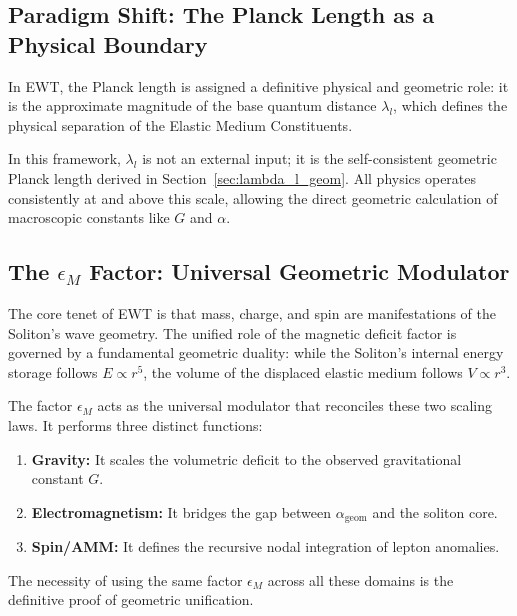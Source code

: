 \documentclass[10pt,a4paper]{article}
\begin{document}
\subsection{Paradigm Shift: The Planck Length as a Physical Boundary}
\label{sec:planck_paradigm}

In EWT, the Planck length is assigned a definitive physical and geometric role: it is the approximate magnitude of the base quantum distance \(\lambda_l\), which defines the physical separation of the Elastic Medium Constituents.

In this framework, \(\lambda_l\) is not an external input; it is the self-consistent geometric Planck length derived in Section~\ref{sec:lambda_l_geom}. All physics operates consistently at and above this scale, allowing the direct geometric calculation of macroscopic constants like \(G\) and \(\alpha\).

\subsection{The \(\epsilon_M\) Factor: Universal Geometric Modulator}
\label{sec:epsilon_M_universal_modulator}

The core tenet of EWT is that mass, charge, and spin are manifestations of the Soliton's wave geometry. The unified role of the magnetic deficit factor is governed by a fundamental geometric duality: while the Soliton's internal energy storage follows \(E \propto r^5\), the volume of the displaced elastic medium follows \(V \propto r^3\).

The factor \(\epsilon_M\) acts as the universal modulator that reconciles these two scaling laws. It performs three distinct functions:

\begin{enumerate}
	\item \textbf{Gravity:}
	It scales the volumetric deficit to the observed gravitational constant \(G\).
	
	\item \textbf{Electromagnetism:}
	It bridges the gap between \(\alpha_{\text{geom}}\) and the soliton core.
	
	\item \textbf{Spin/AMM:}
	It defines the recursive nodal integration of lepton anomalies.
\end{enumerate}

The necessity of using the same factor \(\epsilon_M\) across all these domains is the definitive proof of geometric unification.
\end{document}
